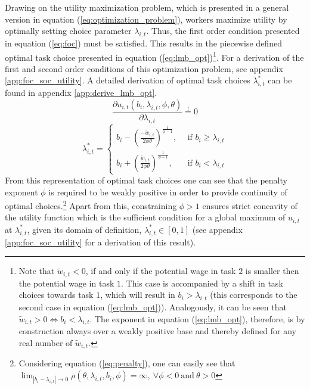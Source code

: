 \documentclass[../main.tex]{subfiles}
\begin{document}
Drawing on the utility maximization problem, which is presented in a general version in equation (\ref{eq:optimization_problem}), workers maximize utility by optimally setting choice parameter $\lambda_{i,t}$. Thus, the first order condition presented in equation (\ref{eq:foc}) must be satisfied. This results in the piecewise defined optimal task choice presented in equation (\ref{eq:lmb_opt})\footnote{Note that $\tilde{w}_{i,t} < 0$, if and only if the potential wage in task $2$ is smaller then the potential wage in task $1$. This case is accompanied by a shift in task choices towards task $1$, which will result in $b_i > \lambda_{i,t}$ (this corresponds to the second case in equation (\ref{eq:lmb_opt})).  Analogously, it can be seen that $\tilde{w}_{i,t} > 0 \iff b_i < \lambda_{i,t}$. The exponent in equation (\ref{eq:lmb_opt}), therefore, is by construction always over a weakly positive base and thereby defined for any real number of $\tilde{w}_{i,t}$.}. For a derivation of the first and second order conditions of this optimization problem, see appendix \ref{app:foc_soc_utility}. A detailed derivation of optimal task choices $\lambda_{i,t}^*$ can be found in appendix \ref{app:derive_lmb_opt}. 
\begin{equation} \label{eq:foc}
	\frac{\partial u_{i,t}(b_i, \lambda_{i,t}, \phi, \theta)}{\partial \lambda_{i,t}} \overset{!}{=} 0
\end{equation}
\begin{equation} \label{eq:lmb_opt}
	\lambda^*_{i,t} = \left\{
	\begin{array}{ll}
		b_i - (\frac{- \tilde{w}_{i,t}}{2 \phi \theta})^{\frac{1}{\phi -1}}, \: & \: \text{if $b_i \geq \lambda_{i,t}$}\\
		b_i + (\frac{\tilde{w}_{i,t}}{2 \phi \theta})^{\frac{1}{\phi - 1}}, \: & \: \text{if $b_i < \lambda_{i,t}$}
	\end{array}
\right.
\end{equation}
From this representation of optimal task choices one can see that the penalty exponent $\phi$ is required to be weakly positive in order to provide continuity of optimal choices.\footnote{Considering equation (\ref{eq:penalty}), one can easily see that $\lim_{|b_i - \lambda_{i,t}|\to 0} \rho (\theta, \lambda_{i,t}, b_i, \phi) = \infty, \: \forall \phi < 0 \: \text{and} \: \theta > 0$} Apart from this, constraining $\phi > 1$ ensures strict concavity of the utility function which is the sufficient condition for a global maximum of $u_{i,t}$ at $\lambda_{i,t}^*$, given its domain of definition, $\lambda_{i,t}^* \in [0,1]$ (see appendix \ref{app:foc_soc_utility} for a derivation of this result). 
\end{document}
